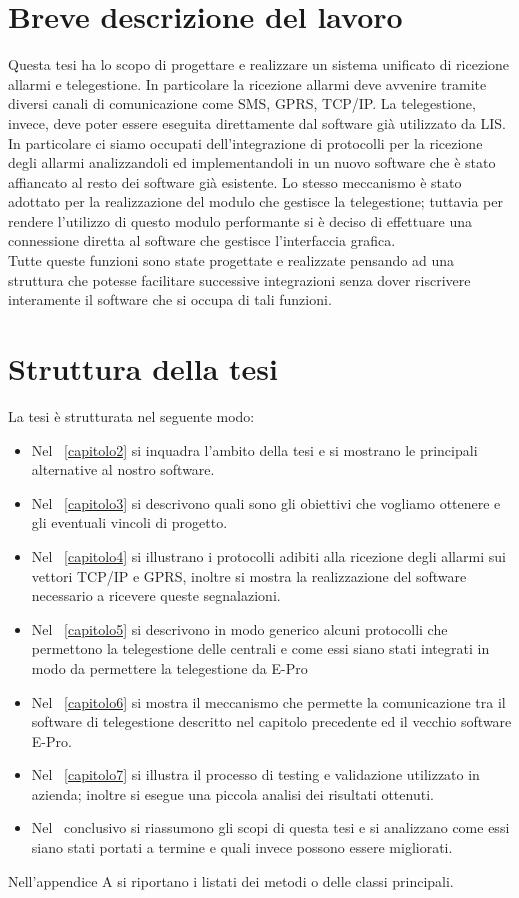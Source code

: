 \section{Breve descrizione del lavoro}
Questa tesi ha lo scopo di progettare e realizzare un sistema unificato di ricezione allarmi e telegestione. In particolare la ricezione allarmi deve avvenire tramite diversi canali di comunicazione come SMS, GPRS, TCP/IP. La telegestione, invece, deve poter essere eseguita direttamente dal software già utilizzato da LIS.\\
In particolare ci siamo occupati dell'integrazione di protocolli per la ricezione degli allarmi analizzandoli ed implementandoli in un nuovo software che è stato affiancato al resto dei software già esistente. Lo stesso meccanismo è stato adottato per la realizzazione del modulo che gestisce la telegestione; tuttavia per rendere l'utilizzo di questo modulo performante si è deciso di effettuare una connessione diretta al software che gestisce l'interfaccia grafica.\\
Tutte queste funzioni sono state progettate e realizzate pensando ad una struttura che potesse facilitare successive integrazioni senza dover riscrivere interamente il software che si occupa di tali funzioni.


\section{Struttura della tesi}
La tesi è strutturata nel seguente modo:
\begin{itemize}
	\item Nel \chaptername~\ref{capitolo2} si inquadra l'ambito della tesi e si mostrano le principali alternative al nostro software.
	\item Nel \chaptername~\ref{capitolo3} si descrivono quali sono gli obiettivi che vogliamo ottenere e gli eventuali vincoli di progetto.
	\item Nel \chaptername~\ref{capitolo4} si illustrano i protocolli adibiti alla ricezione degli allarmi sui vettori TCP/IP e GPRS, inoltre si mostra la realizzazione del software necessario a ricevere queste segnalazioni.
	\item Nel \chaptername~\ref{capitolo5} si descrivono in modo generico alcuni protocolli che permettono la telegestione delle centrali e come essi siano stati integrati in modo da permettere la telegestione da E-Pro
	\item Nel \chaptername~\ref{capitolo6} si mostra il meccanismo che permette la comunicazione tra il software di telegestione descritto nel capitolo precedente ed il vecchio software E-Pro.
	\item Nel \chaptername~\ref{capitolo7} si illustra il processo di testing e validazione utilizzato in azienda; inoltre si esegue una piccola analisi dei risultati ottenuti.
	\item Nel \chaptername~conclusivo si riassumono gli scopi di questa tesi e si analizzano come essi siano stati portati a termine e quali invece possono essere migliorati.
\end{itemize}
Nell'appendice A si riportano i listati dei metodi o delle classi principali.
